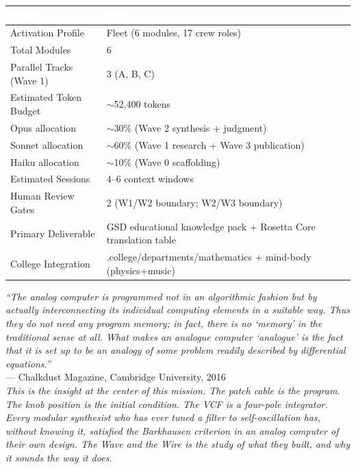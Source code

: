 \documentclass[11pt,letterpaper]{article}
\newcommand{\tableheader}[1]{\textbf{\sffamily\textcolor{white}{#1}}}
\begin{document}
\begin{center}
\begin{tabularx}{\textwidth}{L{5cm}X}
\toprule
{}
\tableheader{Metric} & \tableheader{Value} \\
\midrule
Activation Profile & Fleet (6 modules, 17 crew roles) \\
Total Modules & 6 \\
Parallel Tracks (Wave 1) & 3 (A, B, C) \\
Estimated Token Budget & $\sim$52,400 tokens \\
Opus allocation & $\sim$30\% (Wave 2 synthesis + judgment) \\
Sonnet allocation & $\sim$60\% (Wave 1 research + Wave 3 publication) \\
Haiku allocation & $\sim$10\% (Wave 0 scaffolding) \\
Estimated Sessions & 4--6 context windows \\
Human Review Gates & 2 (W1/W2 boundary; W2/W3 boundary) \\
Primary Deliverable & GSD educational knowledge pack + Rosetta Core translation table \\
College Integration & .college/departments/mathematics + mind-body (physics+music) \\
\bottomrule
\end{tabularx}
\end{center}

\vspace{2em}

\begin{quotebox}
\textit{``The analog computer is programmed not in an algorithmic fashion but by actually interconnecting its individual computing elements in a suitable way. Thus they do not need any program memory; in fact, there is no `memory' in the traditional sense at all. What makes an analogue computer `analogue' is the fact that it is set up to be an analogy of some problem readily described by differential equations.''} \\[0.5em]
--- Chalkdust Magazine, Cambridge University, 2016 \\[0.8em]
\textit{This is the insight at the center of this mission. The patch cable is the program. The knob position is the initial condition. The VCF is a four-pole integrator. Every modular synthesist who has ever tuned a filter to self-oscillation has, without knowing it, satisfied the Barkhausen criterion in an analog computer of their own design. The Wave and the Wire is the study of what they built, and why it sounds the way it does.}
\end{quotebox}
\end{document}
